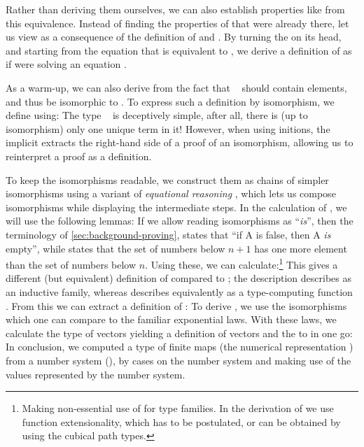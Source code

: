 Rather than deriving them ourselves, we can also establish properties like  from this equivalence. Instead of finding the properties of  that were already there, let us view  as a consequence of the definition of \bN{} and . By turning the  on its head, and starting from the equation that  is equivalent to , we derive a definition of  as if were solving an equation \cite{calcdata}.

As a warm-up, we can also derive  from the fact that \  should contain  elements, and thus be isomorphic to . To express such a definition by isomorphism, we define
using:
The type \  is deceptively simple, after all, there is (up to isomorphism) only one unique term in it! However, when using initions, the implicit  extracts the right-hand side of a proof of an isomorphism, allowing us to reinterpret a proof as a definition.

To keep the isomorphisms readable, we construct them as chains of simpler isomorphisms using a variant of \emph{equational reasoning} \cite{agdastdlib, plfa}, which lets us compose isomorphisms while displaying the intermediate steps. In the calculation of , we will use the following lemmas:
If we allow reading isomorphisms as ``\emph{is}'', then the terminology of \autoref{sec:background-proving},  states that ``if A is false, then A \emph{is} empty'', while  states that the set of numbers below $n+1$ has one more element than the set of numbers below $n$. Using these, we can calculate:\footnote{Making non-essential use of  for type families. In the derivation of  we use function extensionality, which has to be postulated, or can be obtained by using the cubical path types.}
This gives a different (but equivalent) definition of  compared to ; the description  describes  as an inductive family, whereas  describes  equivalently as a type-computing function \cite{progorn}. From this  we can extract a definition of :
To derive , we use the isomorphisms
which one can compare to the familiar exponential laws. With these laws, we calculate the type of vectors
yielding a definition of vectors and the  to  in one go:
In conclusion, we computed a type of finite maps (the numerical representation ) from a number system (\bN{}), by cases on the number system and making use of the values represented by the number system.


